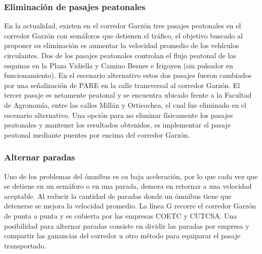 \subsubsection{Eliminación de pasajes peatonales}
En la actualidad, existen en el corredor Garzón tres pasajes peatonales en el corredor Garzón con semáforos que detienen el tráfico, el objetivo buscado al proponer su eliminación es aumentar la velocidad promedio de los vehículos circulantes. Dos de los pasajes peatonales controlan el flujo peatonal de las esquinas en la Plaza Vidiella y Camino Besnes e Irigoyen (sin pulsador en funcionamiento). En el escenario alternativo estos dos pasajes fueron cambiados por una señalización de {PARE} en la calle transversal al corredor Garzón. El tercer pasaje es netamente peatonal y se encuentra ubicado frente a la Facultad de Agronomía, entre las calles Millán y Orticochea, el cual fue eliminado en el escenario alternativo. Una opción para no eliminar físicamente los pasajes peatonales y mantener los resultados obtenidos, es implementar el pasaje peatonal mediante puentes por encima del corredor Garzón.

\subsubsection{Alternar paradas}

Uno de los problemas del ómnibus es su baja aceleración, por lo que cada vez que se detiene en un semáforo o en una parada, demora en retornar a una velocidad aceptable. Al reducir la cantidad de paradas donde un ómnibus tiene que detenerse se mejora la velocidad promedio.
La línea G recorre el corredor Garzón de punta a punta y es cubierta por las empresas COETC y CUTCSA. Una posibilidad para alternar paradas consiste en dividir las paradas por empresa y compartir las ganancias del corredor u otro método para equiparar el pasaje transportado. 

